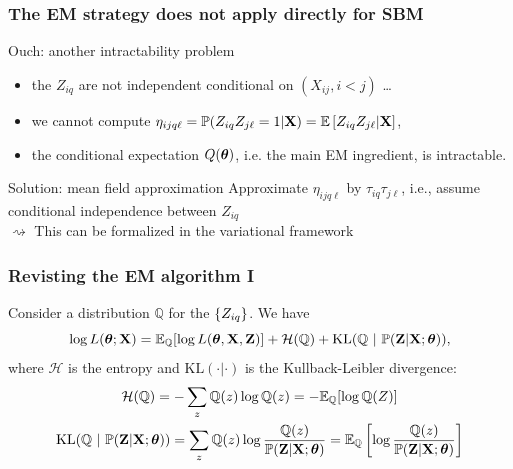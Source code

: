\documentclass{beamer}\usepackage[]{graphicx}\usepackage[]{color}
\begin{document}
\begin{frame}
  \frametitle{The EM strategy does not apply directly for SBM}

  \begin{block}{Ouch: another intractability problem}
    \begin{itemize}
      \item the $Z_{iq}$ are \alert{not independent conditional on $(X_{ij}, i<j)$} \dots
      \item we cannot compute $\eta_{ijq\ell} = \mathbb{P}(Z_{iq}Z_{j\ell} = 1 | \mathbf{X}) = \mathbb{E} \left[Z_{iq}Z_{j\ell} | \mathbf{X}\right]$,
      \item the conditional expectation $Q(\boldsymbol\theta)$, i.e. the main EM ingredient, is \alert{intractable}.
    \end{itemize}
  \end{block}

  \vfill

  \begin{block}{Solution: mean field approximation}
    Approximate $\eta_{ijq\ell}$ by $\tau_{iq}\tau_{j\ell}$, i.e., \alert{assume conditional independence between $Z_{iq}$}\\

    $\rightsquigarrow$ This can be formalized in the variational framework
  \end{block}


\end{frame}

\begin{frame}
  \frametitle{Revisting the EM algorithm I}

  \begin{proposition}
    Consider a distribution $\mathbb{Q}$ for the $\left\{Z_{iq}\right\}$. We have
    \begin{equation*}
      \log L(\boldsymbol\theta; \mathbf{X}) = \mathbb{E}_{\mathbb{Q}} [\log L(\boldsymbol\theta, \mathbf{X},\mathbf{Z})] + \mathcal{H}(\mathbb{Q}) + \mathrm{KL}(\mathbb{Q} \ | \ \mathbb{P}(\mathbf{Z}|\mathbf{X};\boldsymbol\theta)),
    \end{equation*}
    where $\mathcal{H}$ is the entropy and $\mathrm{KL}( \cdot| \cdot)$ is the Kullback-Leibler divergence:
    \begin{gather*}
      \mathcal{H}(\mathbb{Q}) = - \sum_z \mathbb{Q}(z) \log \mathbb{Q}(z) = - \mathbb{E}_\mathbb{Q} [\log \mathbb{Q} (Z)]\\
      \mathrm{KL}(\mathbb{Q} \ | \ \mathbb{P}(\mathbf{Z}|\mathbf{X};\boldsymbol\theta)) = \sum_z \mathbb{Q}(z) \log \frac{\mathbb{Q}(z)}{\mathbb{P}(\mathbf{Z}|\mathbf{X};\boldsymbol\theta)} = \mathbb{E}_\mathbb{Q} \left[\log \frac{\mathbb{Q}(z)}{\mathbb{P}(\mathbf{Z}|\mathbf{X};\boldsymbol\theta)}\right]\\
    \end{gather*}
  \end{proposition}
\end{frame}
\end{document}
